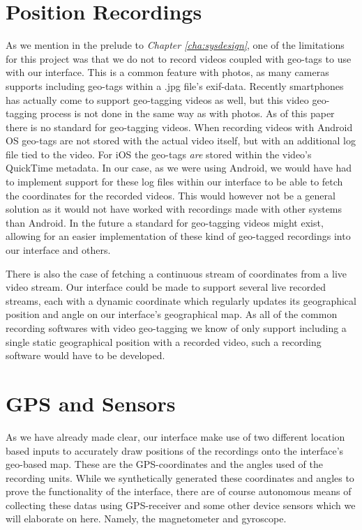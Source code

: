 \section{Position Recordings}
\label{sec:positionrecordings}
As we mention in the prelude to \textit{Chapter \ref{cha:sysdesign}}, one of the limitations for this project was that we do not to record videos coupled with geo-tags to use with our interface. This is a common feature with photos, as many cameras supports including geo-tags within a .jpg file's exif-data. Recently smartphones has actually come to support geo-tagging videos as well, but this video geo-tagging process is not done in the same way as with photos. As of this paper there is no standard for geo-tagging videos. When recording videos with Android OS geo-tags are not stored with the actual video itself, but with an additional log file tied to the video. For iOS the geo-tags \textit{are} stored within the video's QuickTime metadata. In our case, as we were using Android, we would have had to implement support for these log files within our interface to be able to fetch the coordinates for the recorded videos. This would however not be a general solution as it would not have worked with recordings made with other systems than Android. In the future a standard for geo-tagging videos might exist, allowing for an easier implementation of these kind of geo-tagged recordings into our interface and others. 

There is also the case of fetching a continuous stream of coordinates from a live video stream. Our interface could be made to support several live recorded streams, each with a dynamic coordinate which regularly updates its geographical position and angle on our interface's geographical map. As all of the common recording softwares with video geo-tagging we know of only support including a single static geographical position with a recorded video, such a recording software would have to be developed.

\section{GPS and Sensors}
\label{sec:gpsandsensors}
As we have already made clear, our interface make use of two different location based inputs to accurately draw positions of the recordings onto the interface’s geo-based map. These are the GPS-coordinates and the angles used of the recording units. While we synthetically generated these coordinates and angles to prove the functionality of the interface, there are of course autonomous means of collecting these datas using GPS-receiver and some other device sensors which we will elaborate on here. Namely, the magnetometer and gyroscope.

